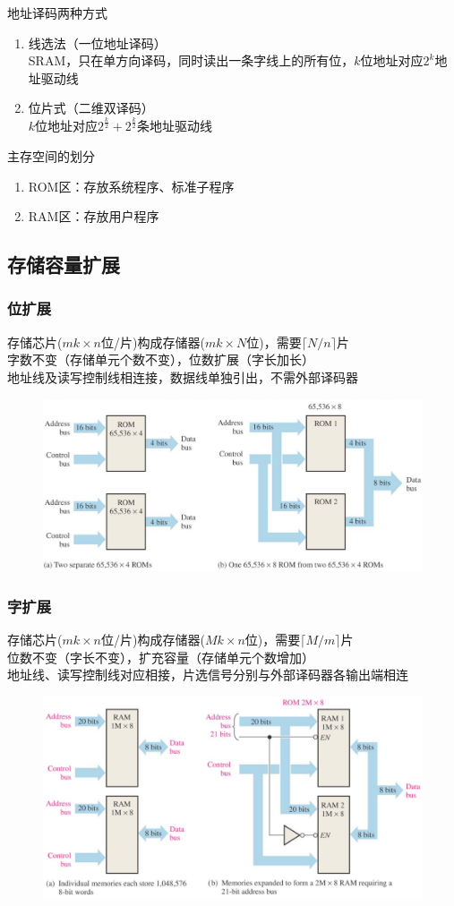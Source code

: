 地址译码两种方式
\begin{enumerate}
	\item 线选法（一位地址译码）\\
	SRAM，只在单方向译码，同时读出一条字线上的所有位，$k$位地址对应$2^k$地址驱动线
	\item 位片式（二维双译码）\\
	$k$位地址对应$2^\frac{k}{2}+2^\frac{k}{2}$条地址驱动线
\end{enumerate}
主存空间的划分
\begin{enumerate}
	\item ROM区：存放系统程序、标准子程序
	\item RAM区：存放用户程序
\end{enumerate}

\subsection{存储容量扩展}
\subsubsection{位扩展}
存储芯片($mk\times n$位/片)构成存储器($mk\times N$位)，需要$\lceil N/n\rceil$片\\
字数不变（存储单元个数不变），位数扩展（字长加长）\\
地址线及读写控制线相连接，数据线单独引出，不需外部译码器
\begin{figure}[H]
\centering
\includegraphics[width=0.6\linewidth]{fig/word-length.PNG}
\end{figure}

\subsubsection{字扩展}
存储芯片($mk\times n$位/片)构成存储器($Mk\times n$位)，需要$\lceil M/m\rceil$片\\
位数不变（字长不变），扩充容量（存储单元个数增加）\\
地址线、读写控制线对应相接，片选信号分别与外部译码器各输出端相连
\begin{figure}[H]
\centering
\includegraphics[width=0.6\linewidth]{fig/word-capacity.PNG}
\end{figure}

